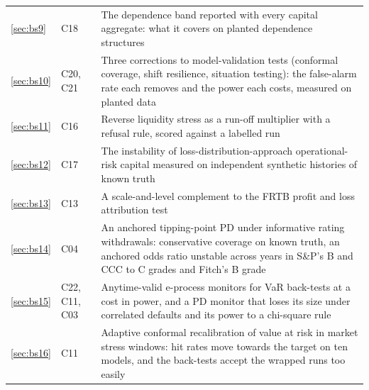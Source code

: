 \begin{table}[htbp]
{\begin{tabular}{llp{}}
\ref{sec:bs9} & C18 & \raggedright\arraybackslash The dependence band reported with every capital aggregate: what it covers on planted dependence structures \\
\ref{sec:bs10} & C20, C21 & \raggedright\arraybackslash Three corrections to model-validation tests (conformal coverage, shift resilience, situation testing): the false-alarm rate each removes and the power each costs, measured on planted data \\
\ref{sec:bs11} & C16 & \raggedright\arraybackslash Reverse liquidity stress as a run-off multiplier with a refusal rule, scored against a labelled run \\
\ref{sec:bs12} & C17 & \raggedright\arraybackslash The instability of loss-distribution-approach operational-risk capital measured on independent synthetic histories of known truth \\
\ref{sec:bs13} & C13 & \raggedright\arraybackslash A scale-and-level complement to the FRTB profit and loss attribution test \\
\ref{sec:bs14} & C04 & \raggedright\arraybackslash An anchored tipping-point PD under informative rating withdrawals: conservative coverage on known truth, an anchored odds ratio unstable across years in S\&P's B and CCC to C grades and Fitch's B grade \\
\ref{sec:bs15} & C22, C11, C03 & \raggedright\arraybackslash Anytime-valid e-process monitors for VaR back-tests at a cost in power, and a PD monitor that loses its size under correlated defaults and its power to a chi-square rule \\
\ref{sec:bs16} & C11 & \raggedright\arraybackslash Adaptive conformal recalibration of value at risk in market stress windows: hit rates move towards the target on ten models, and the back-tests accept the wrapped runs too easily \\
\bottomrule
\end{tabular}}
\end{table}
